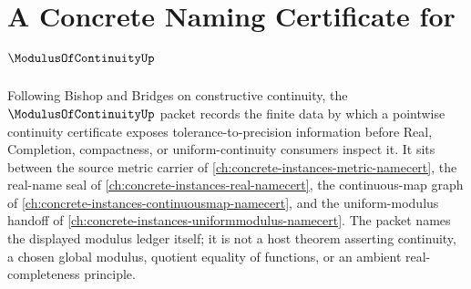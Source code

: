 \chapter{A Concrete Naming Certificate for $\ModulusOfContinuityUp$}
\label{ch:concrete-instances-modulus-of-continuity-namecert}

Following Bishop and Bridges on constructive continuity, the $\ModulusOfContinuityUp$ packet records the finite data by which a pointwise continuity certificate exposes tolerance-to-precision information before Real, Completion, compactness, or uniform-continuity consumers inspect it. It sits between the source metric carrier of \autoref{ch:concrete-instances-metric-namecert}, the real-name seal of \autoref{ch:concrete-instances-real-namecert}, the continuous-map graph of \autoref{ch:concrete-instances-continuousmap-namecert}, and the uniform-modulus handoff of \autoref{ch:concrete-instances-uniformmodulus-namecert}. The packet names the displayed modulus ledger itself; it is not a host theorem asserting continuity, a chosen global modulus, quotient equality of functions, or an ambient real-completeness principle.

